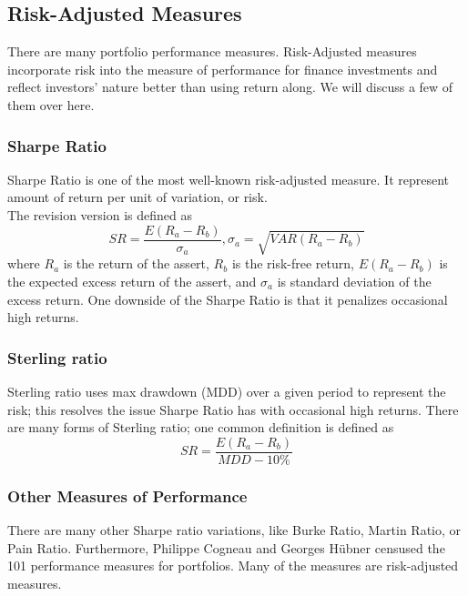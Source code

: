 \subsection{Risk-Adjusted Measures}
There are many portfolio performance measures.\cite{cogneau2009101,cogneau2009more,cogneau2009more2}
Risk-Adjusted measures incorporate risk into the measure of performance for finance investments and reflect investors' nature better than using return along.
We will discuss a few of them over here.
\subsubsection{Sharpe Ratio}
Sharpe Ratio\cite{Sharpe49} is one of the most well-known risk-adjusted measure. It represent amount of return per unit of variation, or risk.\\
The revision version is defined as
\[ SR = \frac{E(R_a - R_b)}{\sigma_a},
\sigma_a = \sqrt{VAR(R_a-R_b)}\]
where \(R_a\) is the return of the assert, 
\(R_b\) is the risk-free return,
\(E(R_a - R_b)\) is the expected excess return of the assert,
and \(\sigma_a\) is standard deviation of the excess return.
One downside of the Sharpe Ratio is that it penalizes occasional high returns\cite{9206647}.
\subsubsection{Sterling ratio}
Sterling ratio\cite{magdon2004maximum} uses max drawdown (MDD) over a given period to represent the risk; this resolves the issue Sharpe Ratio has with occasional high returns. 
There are many forms of Sterling ratio; one common definition\cite{magdon2004maximum} is defined as 
\[ SR = \frac{E(R_a - R_b)}{MDD - 10\%}\]


\subsubsection{Other Measures of Performance}
There are many other Sharpe ratio variations, like Burke Ratio, Martin Ratio, or Pain Ratio\cite{bacon2009sharp}. Furthermore, Philippe Cogneau and Georges Hübner censused the 101 performance measures for portfolios. Many of the measures are risk-adjusted measures\cite{cogneau2009101,cogneau2009more,cogneau2009more2}.